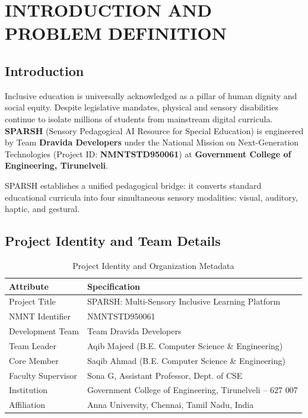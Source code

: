 \documentclass[12pt,a4paper]{report}
\begin{document}
\chapter{INTRODUCTION AND PROBLEM DEFINITION}

\section{Introduction}
Inclusive education is universally acknowledged as a pillar of human dignity and social equity. Despite legislative mandates, physical and sensory disabilities continue to isolate millions of students from mainstream digital curricula. \textbf{SPARSH} (Sensory Pedagogical AI Resource for Special Education) is engineered by Team \textbf{Dravida Developers} under the National Mission on Next-Generation Technologies (Project ID: \textbf{NMNTSTD950061}) at \textbf{Government College of Engineering, Tirunelveli}. 

SPARSH establishes a unified pedagogical bridge: it converts standard educational curricula into four simultaneous sensory modalities: visual, auditory, haptic, and gestural.

\section{Project Identity and Team Details}
\begin{table}[htbp]
    \centering
    \caption{Project Identity and Organization Metadata}
    \vspace{0.2cm}
    \renewcommand{\arraystretch}{1.2}
    \begin{tabular}{|l|p{}|}
        \hline
        \textbf{Attribute} & \textbf{Specification} \\ \hline
        Project Title & SPARSH: Multi-Sensory Inclusive Learning Platform \\ \hline
        NMNT Identifier & NMNTSTD950061 \\ \hline
        Development Team & Team Dravida Developers \\ \hline
        Team Leader & Aqib Majeed (B.E. Computer Science \& Engineering) \\ \hline
        Core Member & Saqib Ahmad (B.E. Computer Science \& Engineering) \\ \hline
        Faculty Supervisor & Sona G, Assistant Professor, Dept. of CSE \\ \hline
        Institution & Government College of Engineering, Tirunelveli -- 627 007 \\ \hline
        Affiliation & Anna University, Chennai, Tamil Nadu, India \\ \hline
    \end{tabular}
\end{table}
\end{document}
